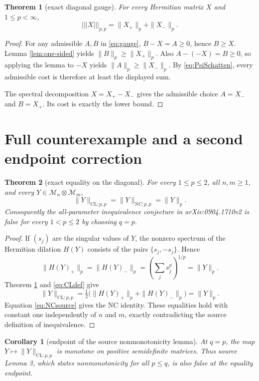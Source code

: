 \documentclass[11pt]{article}
\newtheorem{theorem}{Theorem}
\newtheorem{corollary}{Corollary}
\newcommand{\M}{\mathcal M}
\newcommand{\CL}{\mathrm{CL}}
\newcommand{\NC}{\mathrm{NC}}
\begin{document}
\begin{theorem}[exact diagonal gauge]\label{thm:gauge}
For every Hermitian matrix $X$ and $1\le p<\infty$,
\[
 |||X|||_{p,p}=\|X_+\|_p+\|X_-\|_p.
\]
\end{theorem}

\begin{proof}
For any admissible $A,B$ in \eqref{eq:gauge}, $B-X=A\ge0$, hence
$B\ge X$.  Lemma \ref{lem:one-sided} yields
$\|B\|_p\ge\|X_+\|_p$.  Also $A-(-X)=B\ge0$, so applying the lemma to
$-X$ yields $\|A\|_p\ge\|X_-\|_p$.  By \eqref{eq:PsiSchatten}, every
admissible cost is therefore at least the displayed sum.

The spectral decomposition $X=X_+-X_-$ gives the admissible choice
$A=X_-$ and $B=X_+$.  Its cost is exactly the lower bound.
\end{proof}

\section{Full counterexample and a second endpoint correction}

\begin{theorem}[exact equality on the diagonal]\label{thm:main}
For every $1\le p\le2$, all $n,m\ge1$, and every
$Y\in\M_n\otimes\M_m$,
\[
 \|Y\|_{\CL:p,p}=\|Y\|_{\NC:p,p}=\|Y\|_p.
\]
Consequently the all-parameter inequivalence conjecture in arXiv:0904.1710v2
is false for every $1<p\le2$ by choosing $q=p$.
\end{theorem}

\begin{proof}
If $(s_j)$ are the singular values of $Y$, the nonzero spectrum of the
Hermitian dilation $H(Y)$ consists of the pairs $\{s_j,-s_j\}$.  Hence
\[
 \|H(Y)_+\|_p=\|H(Y)_-\|_p
 =\left(\sum_j s_j^p\right)^{1/p}=\|Y\|_p.
\]
Theorem \ref{thm:gauge} and \eqref{eq:CLdef} give
\[
 \|Y\|_{\CL:p,p}
 =\tfrac12\bigl(\|H(Y)_+\|_p+\|H(Y)_-\|_p\bigr)=\|Y\|_p.
\]
Equation \eqref{eq:NCsource} gives the NC identity.  These equalities hold
with constant one independently of $n$ and $m$, exactly contradicting the
source definition of inequivalence.
\end{proof}

\begin{corollary}[endpoint of the source nonmonotonicity lemma]
At $q=p$, the map $Y\mapsto\|Y\|_{\CL:p,p}$ is monotone on positive
semidefinite matrices.  Thus source Lemma 3, which states nonmonotonicity for
all $p\le q$, is also false at the equality endpoint.
\end{corollary}
\end{document}

